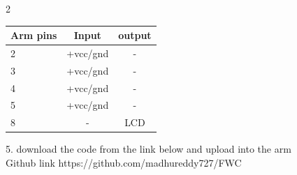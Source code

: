 \documentclass[10pt,a4paper]{report}
\begin{document}
\begin{multicols}{2}
 \begin{center}
 \setlength{\arrayrulewidth}{0.5mm}
\setlength{\tabcolsep}{15pt}
\renewcommand{\arraystretch}{1.5}
    \begin{tabular}{|l|c|c|}
    \hline 
    \textbf{Arm pins} & \textbf{Input} & \textbf{output} \\
    \hline
    2 & +vcc/gnd & -\\
    3 & +vcc/gnd & -\\
    4 & +vcc/gnd & -\\
    5 & +vcc/gnd & -\\
    8 & - & LCD\\
    \hline
      \end{tabular}
  \end{center}
\raggedright 5. download the code from the link below and upload into the arm\\
Github link https://github.com/madhureddy727/FWC

\
\end{multicols}
\
\end{document}
